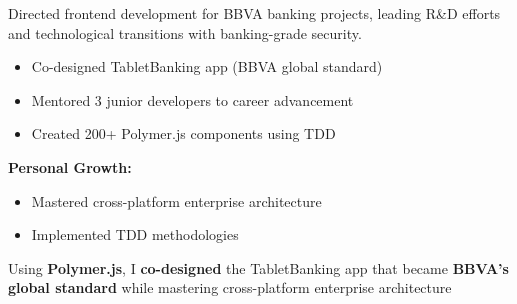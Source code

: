 \documentclass[a4paper,10pt]{article}
\begin{document}
	Directed frontend development for BBVA banking projects, leading R\&D efforts and technological transitions with banking-grade security.

	\begin{itemize}[label=\textcolor{darkblue}{\textbullet}, leftmargin=*, nosep]
		\item Co-designed TabletBanking app (BBVA global standard)
		\item Mentored 3 junior developers to career advancement
		\item Created 200+ Polymer.js components using TDD
	\end{itemize}

	\textbf{Personal Growth:}
	\begin{itemize}[label=\textcolor{darkblue}{\textbullet}, leftmargin=*, nosep]
		\item Mastered cross-platform enterprise architecture
		\item Implemented TDD methodologies
	\end{itemize}

    Using \textbf{Polymer.js}, I \textbf{co-designed} the TabletBanking app that became \textbf{BBVA's global standard} while mastering cross-platform enterprise architecture
\end{document}
